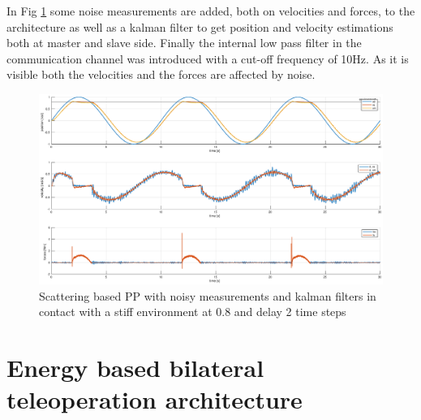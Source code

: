 \documentclass[a4paper,12pt]{article}
\begin{document}
In Fig \ref{fig:scat_pp_contact_kalman} some noise measurements are added, both on velocities and forces, to the architecture as well as a kalman filter to get position and velocity estimations both at master and slave side. Finally the internal low pass filter in the communication channel was introduced with a cut-off frequency of 10Hz. As it is visible both the velocities and the forces are affected by noise.

\begin{figure}[H]
    \begin{center}
        \hspace*{-4.5cm}
        \includegraphics[scale=0.5]{images/scat_pp_contact_kalman.eps}
    \end{center}
    \caption{Scattering based PP with noisy measurements and kalman filters in contact with a stiff environment at 0.8 and delay 2 time steps}
    \label{fig:scat_pp_contact_kalman}
\end{figure}

\newpage
\section{Energy based bilateral teleoperation architecture}
\end{document}
